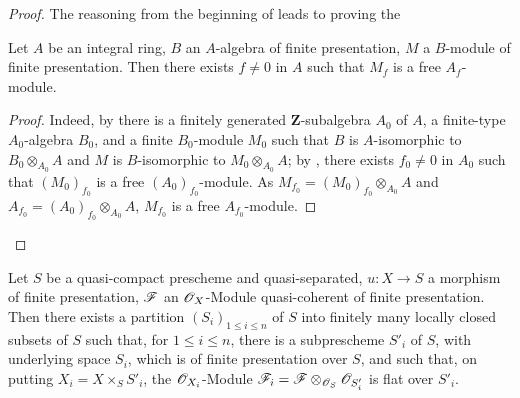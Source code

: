 \begin{proof}
The reasoning from the beginning of  leads to proving the

\begin{lemma}[8.9.4.1]
\label{IV.8.9.4.1}
Let $A$ be an integral ring, $B$ an $A$-algebra of finite presentation, $M$ a $B$-module of finite presentation.
Then there exists $f\neq 0$ in $A$ such that $M_f$ is a free $A_f$-module.
\end{lemma}

\begin{proof}
Indeed, by  there is a finitely generated $\mathbf{Z}$-subalgebra $A_0$ of $A$, a finite-type $A_0$-algebra $B_0$, and a finite $B_0$-module $M_0$ such that $B$ is $A$-isomorphic to $B_0\otimes_{A_0}A$ and $M$ is $B$-isomorphic to $M_0\otimes_{A_0}A$; by , there exists $f_0\neq 0$ in $A_0$ such that $(M_0)_{f_0}$ is a free $(A_0)_{f_0}$-module.
As $M_{f_0}=(M_0)_{f_0}\otimes_{A_0}A$ and $A_{f_0}=(A_0)_{f_0}\otimes_{A_0}A$, $M_{f_0}$ is a free $A_{f_0}$-module.
\end{proof}
\end{proof}

\begin{corollary}[8.9.5]
\label{IV.8.9.5}
Let $S$ be a quasi-compact prescheme and quasi-separated, $u:X\to S$ a morphism of finite presentation, $\mathscr{F}$ an $\mathscr{O}_X$-Module quasi-coherent of finite presentation.
Then there exists a partition $(S_i)_{1\leqslant i\leqslant n}$ of $S$ into finitely many locally closed subsets of $S$ such that, for $1\leqslant i\leqslant n$, there is a subprescheme $S'_i$ of $S$, with underlying space $S_i$, which is of finite presentation over $S$, and such that, on putting $X_i=X\times_S S'_i$, the $\mathscr{O}_{X_i}$-Module $\mathscr{F}_i=\mathscr{F}\otimes_{\mathscr{O}_S}\mathscr{O}_{S'_i}$ is flat over $S'_i$.
\end{corollary}

